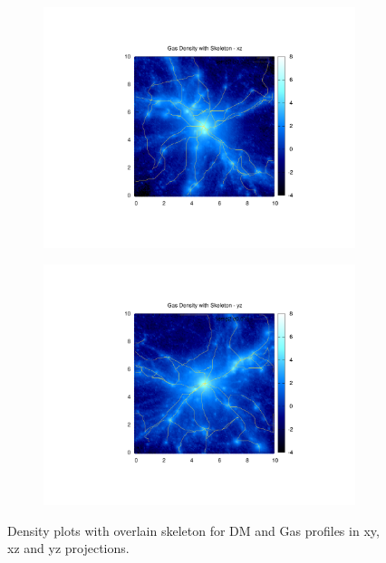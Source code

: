 \documentclass[journal]{IEEEtran}
\begin{document}
\begin{figure}[t!]
\begin{subfigure}[t]{0.3\textwidth}
		\includegraphics[width=\linewidth]{GasDenSkelxz}
	\end{subfigure}
	\quad
	\begin{subfigure}[t]{0.3\textwidth}
		\centering
		\includegraphics[width=\linewidth]{GasDenSkelyz}
	\end{subfigure}
\label{fig:densities}
\caption{Density plots with overlain skeleton for DM and Gas profiles in xy, xz and yz projections.}
\end{figure}
\end{document}
